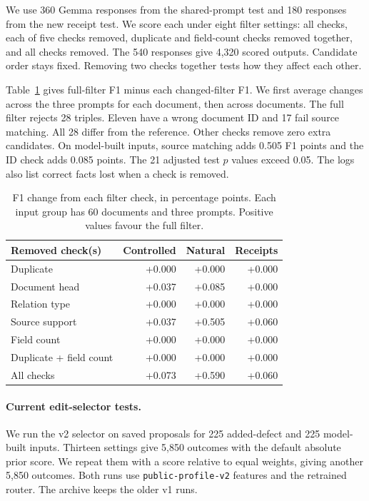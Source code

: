 We use 360 Gemma responses from the shared-prompt test and 180 responses
from the new receipt test. We score each under eight filter settings:
all checks, each of five checks removed, duplicate and field-count checks
removed together, and all checks removed. The 540 responses give 4,320
scored outputs. Candidate order stays fixed.
Removing two checks together tests how they affect each other.

Table~\ref{tab:gate_checks} gives full-filter F1 minus each changed-filter
F1. We first average changes across the three prompts for each document,
then across documents. The full filter rejects 28 triples.
Eleven have a wrong document ID and 17 fail source matching.
All 28 differ from the reference. Other checks remove zero extra candidates.
On model-built inputs, source matching adds 0.505 F1 points and the ID check
adds 0.085 points. The 21 adjusted test $p$ values exceed 0.05.
The logs also list correct facts lost when a check is removed.

\begin{table}[t]
\centering
\caption{F1 change from each filter check, in percentage points. Each input group has 60 documents and three prompts. Positive values favour the full filter.}
\label{tab:gate_checks}
\small
\begin{tabular}{lrrr}
\toprule
Removed check(s) & Controlled & Natural & Receipts \\
\midrule
Duplicate & +0.000 & +0.000 & +0.000 \\
Document head & +0.037 & +0.085 & +0.000 \\
Relation type & +0.000 & +0.000 & +0.000 \\
Source support & +0.037 & +0.505 & +0.060 \\
Field count & +0.000 & +0.000 & +0.000 \\
Duplicate + field count & +0.000 & +0.000 & +0.000 \\
All checks & +0.073 & +0.590 & +0.060 \\
\bottomrule
\end{tabular}
\end{table}

\paragraph{Current edit-selector tests.}

We run the v2 selector on saved proposals for 225 added-defect and 225
model-built inputs. Thirteen settings give 5,850 outcomes with the default
absolute prior score. We repeat them with a score relative to equal weights,
giving another 5,850 outcomes. Both runs use \texttt{public-profile-v2}
features and the retrained router. The archive keeps the older v1 runs.

